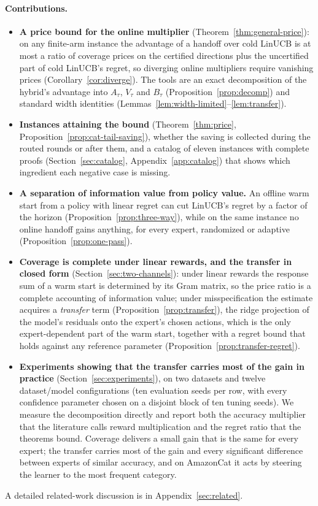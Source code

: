 \documentclass{article}
\theoremstyle{definition}
\theoremstyle{remark}
\theoremstyle{remark}
\begin{document}
\paragraph{Contributions.}
\begin{itemize}[itemsep=1pt, topsep=1pt, leftmargin=*]
\item \textbf{A price bound for the online multiplier}
(Theorem~\ref{thm:general-price}): on any finite-arm instance the advantage
of a handoff over cold LinUCB is at most a ratio of coverage prices on the
certified directions plus the uncertified part of cold LinUCB's regret, so
diverging online multipliers require vanishing prices
(Corollary~\ref{cor:diverge}). The tools are an exact decomposition of the
hybrid's advantage into $A_\tau$, $V_\tau$ and $B_\tau$
(Proposition~\ref{prop:decomp}) and standard width identities
(Lemmas~\ref{lem:width-limited}--\ref{lem:transfer}).
\item \textbf{Instances attaining the bound} (Theorem~\ref{thm:price},
Proposition~\ref{prop:cat-tail-saving}), whether the saving is collected
during the routed rounds or after them, and a catalog of eleven instances with
complete proofs (Section~\ref{sec:catalog}, Appendix~\ref{app:catalog}) that
shows which ingredient each negative case is missing.
\item \textbf{A separation of information value from policy value.} An
offline warm start from a policy with linear regret can cut LinUCB's regret by
a factor of the horizon (Proposition~\ref{prop:three-way}), while on the same
instance no online handoff gains anything, for every expert, randomized or
adaptive (Proposition~\ref{prop:one-pass}).
\item \textbf{Coverage is complete under linear rewards, and the transfer in
closed form} (Section~\ref{sec:two-channels}): under linear rewards the
response sum of a warm start is determined by its Gram matrix, so the price
ratio is a complete accounting of information value; under misspecification
the estimate acquires a \emph{transfer} term (Proposition~\ref{prop:transfer}),
the ridge projection of the model's residuals onto the expert's chosen
actions, which is the only expert-dependent part of the warm start, together
with a regret bound that holds against any reference parameter
(Proposition~\ref{prop:transfer-regret}).
\item \textbf{Experiments showing that the transfer carries most of the gain
in practice} (Section~\ref{sec:experiments}), on two datasets and twelve
dataset/model configurations (ten evaluation seeds per row, with every
confidence parameter chosen on a disjoint block of ten tuning seeds). We
measure the decomposition directly and report both the accuracy multiplier
that the literature calls reward multiplication and the regret ratio that the
theorems bound. Coverage delivers a small gain that is the same for every
expert; the transfer carries most of the gain and every significant
difference between experts of similar accuracy, and on AmazonCat it acts by
steering the learner to the most frequent category.
\end{itemize}
A detailed related-work discussion is in Appendix~\ref{sec:related}.
\end{document}
